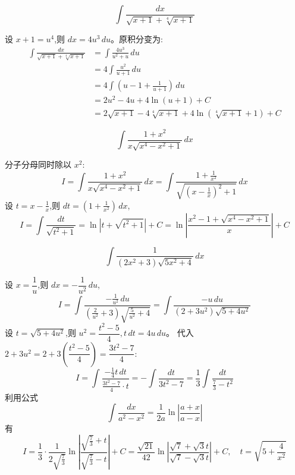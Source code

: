 \begin{questions}
    \question 
    \[
    \int \frac{dx}{\sqrt{x+1} + \sqrt[4]{x+1}}
    \]
    \begin{solution}
        设 $x+1 = u^4$,则 $dx = 4u^3 \, du$。原积分变为:
        \begin{align*}
        \int \frac{dx}{\sqrt{x+1} + \sqrt[4]{x+1}} 
        &= \int \frac{4u^3}{u^2+u} \, du \\
        &= 4 \int \frac{u^2}{u+1} \, du \\
        &= 4 \int \left(u - 1 + \frac{1}{u+1}\right) \, du  \\
        &= 2u^2 - 4u + 4\ln(u+1) + C \\
        &= 2\sqrt{x+1} - 4\sqrt[4]{x+1} + 4\ln(\sqrt[4]{x+1}+1) + C
        \end{align*}
    \end{solution}

    \question
    \[
    \int \frac{1+x^2}{x\sqrt{x^4-x^2+1}} \, dx
    \]
    \begin{solution}
        分子分母同时除以 $x^2$:
        \[
        I = \int \frac{1+x^2}{x\sqrt{x^4-x^2+1}} \, dx = \int \frac{1 + \frac{1}{x^2}}{\sqrt{(x - \frac{1}{x})^2 + 1}} \, dx
        \]
        设 $t = x - \frac{1}{x}$,则 $dt = (1 + \frac{1}{x^2}) \, dx$,
        \[
        I = \int \frac{dt}{\sqrt{t^2+1}} = \ln|t + \sqrt{t^2+1}| + C  = \ln\left| \frac{x^2-1 + \sqrt{x^4-x^2+1}}{x} \right| + C
        \]
    \end{solution}

    \question
    \[
    \int \frac{1}{(2x^2+3)\sqrt{5x^2+4}} \, dx
    \]
    \begin{solution}
        设 $x = \dfrac{1}{u}$,则 $dx = -\dfrac{1}{u^2} \, du$,
        \[
        I = \int \frac{-\frac{1}{u^2} \, du}{(\frac{2}{u^2}+3)\sqrt{\frac{5}{u^2}+4}} = \int \frac{-u \, du}{(2+3u^2)\sqrt{5+4u^2}}
        \]
        设 $t = \sqrt{5+4u^2}$,则 $u^2 = \dfrac{t^2-5}{4},t \, dt = 4u \, du$。
        代入 $2+3u^2 = 2 + 3\left(\dfrac{t^2-5}{4}\right) = \dfrac{3t^2-7}{4}$:
        \[
        I = \int \frac{-\frac{1}{4}t \, dt}{\frac{3t^2-7}{4} \cdot t} = -\int \frac{dt}{3t^2-7} = \frac{1}{3} \int \frac{dt}{\frac{7}{3}-t^2}
        \]
        利用公式 
        \[
        \int \frac{dx}{a^2-x^2} = \frac{1}{2a}\ln\left|\frac{a+x}{a-x}\right|
        \]
        有
        \[
        I = \frac{1}{3} \cdot \frac{1}{2\sqrt{\frac{7}{3}}} \ln\left| \frac{\sqrt{\frac{7}{3}}+t}{\sqrt{\frac{7}{3}}-t} \right| + C = \frac{\sqrt{21}}{42} \ln\left| \frac{\sqrt{7}+\sqrt{3}t}{\sqrt{7}-\sqrt{3}t} \right| + C, \quad t = \sqrt{5+\frac{4}{x^2}}
        \]
    \end{solution}


\end{questions}
